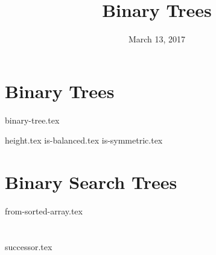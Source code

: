 \documentclass{exam}
\title{Binary Trees}
\date{March 13, 2017}
\begin{document}
\maketitle

\section{Binary Trees}
{binary-tree.tex}
\begin{questions}
{height.tex}
{is-balanced.tex}
\clearpage
{}\vspace*{-2em}
{is-symmetric.tex}
\end{questions}

\clearpage

\section{Binary Search Trees}
\begin{questions}
{from-sorted-array.tex}
\end{questions}

\clearpage

\section{}
\begin{questions}
{successor.tex}
\end{questions}
\end{document}
